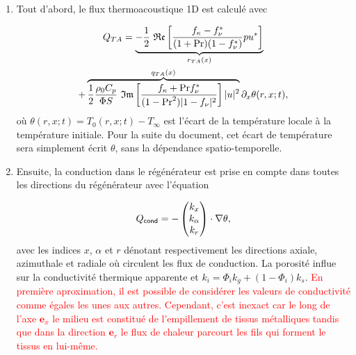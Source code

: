 \begin{enumerate}[label=\textbf{(\roman*)}]
\item Tout d'abord, le flux thermoacoustique 1D est calculé avec

\begin{multline}
	Q_{TA} = \underbrace{ -\frac12~\mathfrak{Re}\left[ \frac{ f_\kappa-f_\nu^* }{ (1+\mathrm{Pr})(1-f_\nu^*) } pu^* \right] }_{r_{TA}(x)} \\ 
	+ \overbrace{ \frac12 \frac{\rho_0 C_p}{\Phi S}~\mathfrak{Im}\left[ \frac{f_\kappa + \mathrm{Pr} f_\nu^*}{(1-\mathrm{Pr}^2)|1-f_\nu|^2} \right] |u|^2 }^{q_{TA}(x)}\partial_x \theta(r,x;t),
\label{eq:FluxTA_Lotton_Regen}
\end{multline}
où $\theta(r,x;t) = T_0(r,x;t)-T_\infty$ est l'écart de la température locale à la température initiale. Pour la suite du document, cet écart de température sera simplement écrit $\theta$, sans la dépendance spatio-temporelle. 

\item Ensuite, la conduction dans le régénérateur est prise en compte dans toutes les directions du régénérateur avec l'équation

\begin{equation}
	Q_{\sf cond} = -\begin{pmatrix}
	k_x\\
	k_\alpha\\
	k_r
	\end{pmatrix} \cdot \nabla \theta,
	\label{eq:FluxCond_Lotton}
\end{equation}
avec les indices $x$, $\alpha$ et $r$ dénotant respectivement les directions axiale, azimuthale et radiale où circulent les flux de conduction. La porosité influe sur la conductivité thermique apparente et $k_i=\Phi_i k_{g} + (1-\Phi_i)k_{s}$. \textcolor{red}{En première aproximation, il est possible de considérer les valeurs de conductivité comme égales les unes aux autres. Cependant, c'est inexact car le long de l'axe $\mathbf e_x$ le milieu est constitué de l'empillement de tissus métalliques tandis que dans la direction $\mathbf e_r$ le flux de chaleur parcourt les fils qui forment le tissus en lui-même.}

%
%


\end{enumerate}
